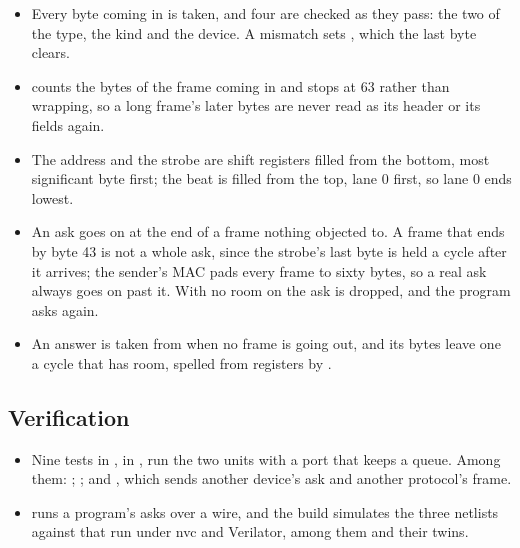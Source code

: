 \begin{itemize}
\item Every byte coming in is taken, and four are checked as they pass:
the two of the type, the kind and the device. A mismatch sets
, which the last byte clears.
\item {} counts the bytes of the frame coming in and stops at
63 rather than wrapping, so a long frame's later bytes are never read
as its header or its fields again.
\item The address and the strobe are shift registers filled from the
bottom, most significant byte first; the beat is filled from the top,
lane 0 first, so lane 0 ends lowest.
\item An ask goes on  at the end of a frame nothing objected
to. A frame that ends by byte 43 is not a whole ask, since the strobe's
last byte is held a cycle after it arrives; the sender's MAC pads every
frame to sixty bytes, so a real ask always goes on past it. With no
room on  the ask is dropped, and the program asks again.
\item An answer is taken from  when no frame is going out,
and its bytes leave one a cycle that  has room, spelled from
registers by .
\end{itemize}

\subsection*{Verification}

\begin{itemize}
\item Nine tests in , in
, run the two units with a port that keeps
a queue. Among them: ;
; and
, which sends another device's ask
and another protocol's frame.
\item {} runs a program's asks over a
wire, and the build simulates the three netlists against that run under
nvc and Verilator, among them\newline
{}\newline
{}\newline
and their  twins.
\end{itemize}

